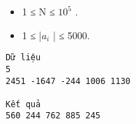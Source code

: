 \begin{itemize}
	\item     1 ≤ N ≤ $10^{5}$    .   
	\item     1 ≤ |$a_{i}$    | ≤ 5000.   
\end{itemize}
\begin{verbatim}
Dữ liệu
5
2451 -1647 -244 1006 1130

Kết quả
560 244 762 885 245	
\end{verbatim}